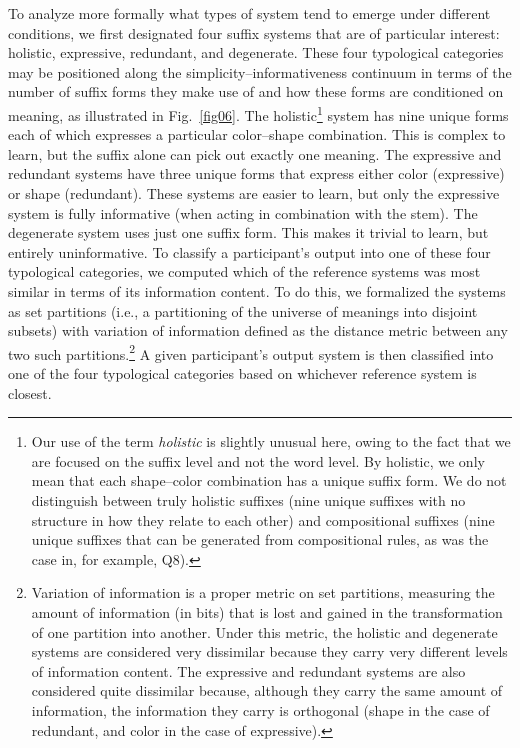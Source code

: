 \documentclass[doc,biblatex]{apa7}
\begin{document}
To analyze more formally what types of system tend to emerge under different conditions, we first designated four suffix systems that are of particular interest: holistic, expressive, redundant, and degenerate. These four typological categories may be positioned along the simplicity--informativeness continuum in terms of the number of suffix forms they make use of and how these forms are conditioned on meaning, as illustrated in Fig.~\ref{fig06}. The holistic\footnote{Our use of the term \textit{holistic} is slightly unusual here, owing to the fact that we are focused on the suffix level and not the word level. By holistic, we only mean that each shape--color combination has a unique suffix form. We do not distinguish between truly holistic suffixes (nine unique suffixes with no structure in how they relate to each other) and compositional suffixes (nine unique suffixes that can be generated from compositional rules, as was the case in, for example, Q8).} system has nine unique forms each of which expresses a particular color--shape combination. This is complex to learn, but the suffix alone can pick out exactly one meaning. The expressive and redundant systems have three unique forms that express either color (expressive) or shape (redundant). These systems are easier to learn, but only the expressive system is fully informative (when acting in combination with the stem). The degenerate system uses just one suffix form. This makes it trivial to learn, but entirely uninformative. To classify a participant's output into one of these four typological categories, we computed which of the reference systems was most similar in terms of its information content. To do this, we formalized the systems as set partitions (i.e., a partitioning of the universe of meanings into disjoint subsets) with variation of information \parencite{Meila:2007} defined as the distance metric between any two such partitions.\footnote{Variation of information is a proper metric on set partitions, measuring the amount of information (in bits) that is lost and gained in the transformation of one partition into another. Under this metric, the holistic and degenerate systems are considered very dissimilar because they carry very different levels of information content. The expressive and redundant systems are also considered quite dissimilar because, although they carry the same amount of information, the information they carry is orthogonal (shape in the case of redundant, and color in the case of expressive).} A given participant's output system is then classified into one of the four typological categories based on whichever reference system is closest.
\end{document}
